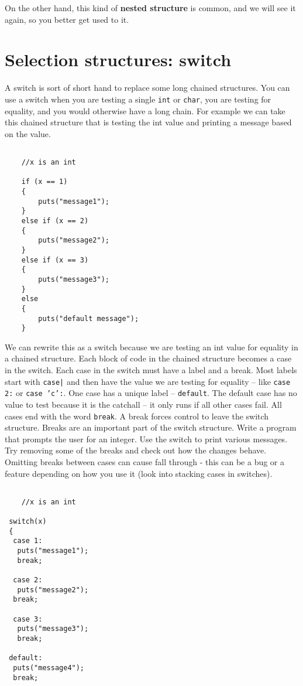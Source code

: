 On the other hand, this kind of {\bf nested structure} is common, and
we will see it again, so you better get used to it.


\section{Selection structures: switch}

A switch is sort of short hand to replace some long chained structures. 
You can use a switch when you are testing a single {\tt int} or {\tt char}, you
are testing for equality, and you would otherwise have a long chain. For example we can take this chained structure that is testing the 
int value and printing a message based on the value.

\begin{verbatim}
	
	//x is an int
	
	if (x == 1) 
	{
		puts("message1");
	} 
	else if (x == 2) 
	{
		puts("message2");
	} 
	else if (x == 3) 
	{
		puts("message3");
	} 
	else 
	{
		puts("default message");
	}
\end{verbatim}
%

We can rewrite this as a switch because we are testing an int value for equality in a chained structure. Each block of code in the chained structure 
becomes a case in the switch. Each case in the switch must have a label and a break. Most labels start with {\tt case|} and then have the value we are testing for equality --
like {\tt case 2:} or {\tt case 'c':}. One case has a unique label -- {\tt default}. The default case has no value to test because it is the catchall -- it only runs if all other cases fail. All cases end with the word {\tt break}. A break forces control to leave the switch structure. Breaks are an important part of the switch structure.
Write a program that prompts the user for an integer. Use the switch to print various messages. Try removing some of the breaks and  check out how the changes behave.
Omitting breaks between cases can cause fall through - this can be a bug or a feature depending on how you use it (look into stacking cases in switches).


\begin{verbatim}
	
	//x is an int
	
 switch(x)
 {
  case 1:
   puts("message1");
   break;

  case 2:
   puts("message2");
  break;

  case 3:
   puts("message3");
   break;

 default:
  puts("message4");
  break;
		
	\end{verbatim}

